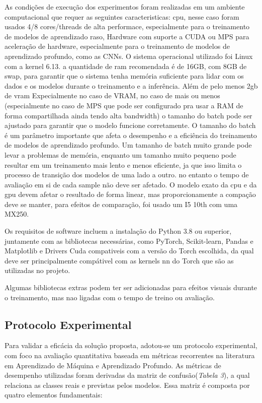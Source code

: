\documentclass[conference]{IEEEtran}
\begin{document}
As condições de execução dos experimentos foram realizadas em um ambiente computacional que requer as seguintes caracteristicas:
cpu, nesse caso foram usados 4/8 cores/threads de alta performace, especialmente para o treinamento de modelos de aprendizado raso, 
Hardware com suporte a CUDA ou MPS para aceleração de hardware, especialmente para o treinamento de modelos de aprendizado profundo, como as CNNs. O sistema operacional utilizado foi Linux com a kernel 6.13.
a quantidade de ram recomendada é de 16GB, com 8GB de swap, para garantir que o sistema tenha memória suficiente para lidar com os dados e os modelos durante o treinamento e a inferência. Além de pelo menos 2gb de vram
Expecialmente no caso de VRAM, no caso de mais ou menos (especialmente no caso de MPS que pode ser configurado pra usar a RAM de forma compartilhada ainda tendo alta bandwidth) o tamanho do batch pode ser ajustado para garantir que o modelo funcione corretamente. O tamanho do batch é um parâmetro importante que afeta o desempenho e a eficiência do treinamento de modelos de aprendizado profundo. Um tamanho de batch muito grande pode levar a problemas de memória, enquanto um tamanho muito pequeno pode resultar em um treinamento mais lento e menos eficiente, ja que isso limita o processo de transição dos modelos de uma lado a outro. no entanto o tempo de avaliação em si de cada sample não deve ser afetado.
O modelo exato da cpu e da gpu devem afetar o resultado de forma linear, mas proporcionamente a compação deve se manter, para efeitos de comparação, foi usado um I5 10th com uma MX250. 

Os requisitos de software incluem a instalação do Python 3.8 ou superior, juntamente com as bibliotecas necessárias, como PyTorch, Scikit-learn, Pandas e Matplotlib e Drivers Cuda compativeis com a versão do Torch escolhida, da qual deve ser principalmente compátivel com as kernels nn do Torch que são as utilizadas no projeto.

Algumas bibliotecas extras podem ter ser adicionadas para efeitos visuais durante o treinamento, mas nao ligadas com o tempo de treino ou avaliação.

\subsection{Protocolo Experimental}

    Para validar a eficácia da solução proposta, adotou-se um protocolo experimental, com foco na avaliação quantitativa baseada em métricas recorrentes na literatura em Aprendizado de Máquina e Aprendizado Profundo. As métricas de desempenho utilizadas foram derivadas da matriz de confusão(\textit{Tabela 3}), a qual relaciona as classes reais e previstas pelos modelos. Essa matriz é composta por quatro elementos fundamentais:
    
\end{document}
